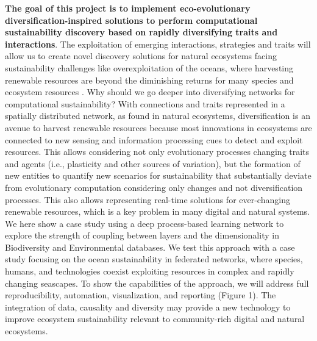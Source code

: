 \documentclass[12pt,a4paper]{article}
\begin{document}
\textbf{The goal of this project is to implement eco-evolutionary diversification-inspired solutions to perform computational sustainability discovery based on rapidly diversifying traits and interactions}. The exploitation of emerging interactions, strategies and traits will allow us to create novel discovery solutions for natural ecosystems facing sustainability challenges like overexploitation of the oceans, where harvesting renewable resources are beyond the diminishing returns for many species and ecosystem resources \citep{Paulyetal1998, Mastrangelo2019}. Why should we go deeper into diversifying networks for computational sustainability? With connections and traits represented in a spatially distributed network, as found in natural ecosystems, diversification is an avenue to harvest renewable resources because most innovations in ecosystems are connected to new sensing and information processing cues to detect and exploit resources. This allows considering not only evolutionary processes changing traits and agents (i.e., plasticity and other sources of variation), but the formation of new entities to quantify new scenarios for sustainability that substantially deviate from evolutionary computation considering only changes and not diversification processes. This also allows representing real-time solutions for ever-changing renewable resources, which is a key problem in many digital and natural systems. We here show a case study using a deep process-based learning network to explore the strength of
coupling between layers and the dimensionality in Biodiversity and Environmental databases. We test this approach with a case study focusing on the ocean sustainability in federated networks, where species, humans, and technologies coexist exploiting resources in complex and rapidly changing seascapes. To show the capabilities of the approach, we will address full reproducibility, automation, visualization, and reporting (Figure 1). The integration of data, causality and diversity may provide a new technology to improve ecosystem sustainability relevant to community-rich digital and natural ecosystems.
\end{document}
